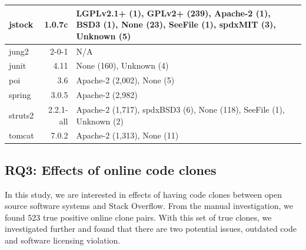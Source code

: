\documentclass{sig-alternate-05-2015}
\begin{document}
\begin{table}
\begin{tabular}{l|r|p{4cm}}
		jstock & 1.0.7c & LGPLv2.1+ (1), \newline GPLv2+ (239), \newline Apache-2 (1), BSD3 (1), \newline None (23), SeeFile (1), \newline spdxMIT (3), Unknown (5)\\
		\hline
		jung2 & 2-0-1 & N/A \\
		\hline
		junit & 4.11 & None (160), Unknown (4)  \\
		\hline
		poi & 3.6 & Apache-2 (2,002), None (5) \\
		\hline
		spring & 3.0.5 & Apache-2 (2,982) \\
		\hline
		struts2 & 2.2.1-all & Apache-2 (1,717), \newline spdxBSD3 (6), \newline None (118), SeeFile (1), \newline Unknown (2) \\
		\hline
		tomcat & 7.0.2 & Apache-2 (1,313), None (11) \\
		\hline
	\end{tabular} %
\end{table}


\subsection{RQ3: Effects of online code clones}

In this study, we are interested in effects of having code clones between open source software systems and Stack Overflow. From the manual investigation, we found 523 true positive online clone pairs. With this set of true clones, we investigated further and found that there are two potential issues, outdated code and software licensing violation.
\end{document}
